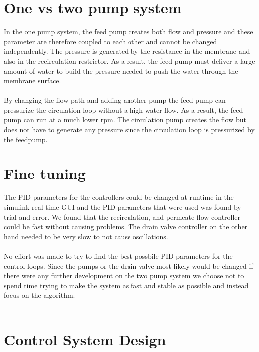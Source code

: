 \section{One vs two pump system}

In the one pump system, the feed pump creates both flow and pressure and these parameter are therefore coupled to each other and cannot be changed independently. The pressure is generated by the resistance in the membrane and also in the recirculation restrictor. As a result, the feed pump must deliver a large amount of water to build the pressure needed to push the water through the membrane surface. \\
\\
By changing the flow path and adding another pump the feed pump can pressurize the circulation loop without a high water flow. As a result, the feed pump can run at a much lower rpm. The circulation pump creates the flow but does not have to generate any pressure since the circulation loop is pressurized by the feedpump.

\section{Fine tuning}

The PID parameters for the controllers could be changed at runtime in the simulink real time GUI and the PID parameters that were used was found by trial and error. We found that the recirculation, and permeate flow controller could be fast without causing problems. The drain valve controller on the other hand needed to be very slow to not cause oscillations. \\
\\
No effort was made to try to find the best possbile PID parameters for the control loops. Since the pumps or the drain valve most likely would be changed if there were any further development on the two pump system we choose not to spend time trying to make the system as fast and stable as possible and instead focus on the algorithm. \\
\\
\section{Control System Design}

